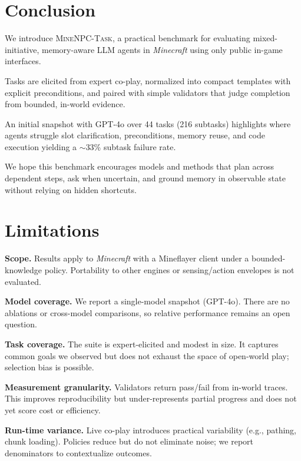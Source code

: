 \section{Conclusion}
We introduce \textsc{MineNPC-Task}, a practical benchmark for evaluating mixed-initiative, memory-aware LLM agents in \emph{Minecraft} using only public in-game interfaces. 

Tasks are elicited from expert co-play, normalized into compact templates with explicit preconditions, and paired with simple validators that judge completion from bounded, in-world evidence. 

An initial snapshot with GPT-4o over 44 tasks (216 subtasks) highlights where agents struggle slot clarification, preconditions, memory reuse, and code execution yielding a \(\sim\)33\% subtask failure rate. 

We hope this benchmark encourages models and methods that plan across dependent steps, ask when uncertain, and ground memory in observable state without relying on hidden shortcuts.

\section{Limitations}

\textbf{Scope.} Results apply to \emph{Minecraft} with a Mineflayer client under a bounded-knowledge policy. Portability to other engines or sensing/action envelopes is not evaluated.

\textbf{Model coverage.} We report a single-model snapshot (GPT-4o). There are no ablations or cross-model comparisons, so relative performance remains an open question.

\textbf{Task coverage.} The suite is expert-elicited and modest in size. It captures common goals we observed but does not exhaust the space of open-world play; selection bias is possible.

\textbf{Measurement granularity.} Validators return pass/fail from in-world traces. This improves reproducibility but under-represents partial progress and does not yet score cost or efficiency.

\textbf{Run-time variance.} Live co-play introduces practical variability (e.g., pathing, chunk loading). Policies reduce but do not eliminate noise; we report denominators to contextualize outcomes.

